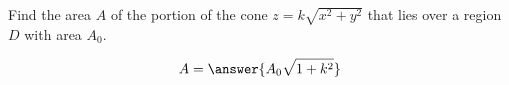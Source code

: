 \documentclass{ximera}
\author{David Guichard \and Neal Koblitz \and H. Jerome Keisler \and Albert Scheller \and Barry Balof \and Mike Wills \and Matthew Carr}
\begin{document}
\begin{exercise}




Find the area $A$ of the portion of the cone $z=k\sqrt{x^2+y^2}$ that lies over a region $D$ with area $A_0$.
\begin{prompt}
\[
A=\answer{A_0 \sqrt{1+k^2}}
\]
\end{prompt}


\end{exercise}
\end{document}
